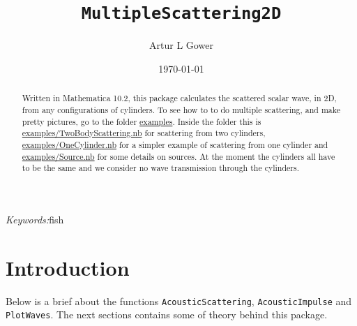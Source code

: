 \documentclass[ 12pt, a4paper]{article}
\begin{document}
\title{ \texttt{MultipleScattering2D}}
\author{
Artur L Gower\footnotemark[2]  \\[12pt]
}
\date{\today}
\maketitle


\begin{abstract}
Written in Mathematica 10.2, this package calculates the scattered scalar wave, in 2D, from any configurations of cylinders. To see how to to do multiple scattering, and make pretty pictures, go to the folder \url{examples}. Inside the folder this is \url{examples/TwoBodyScattering.nb} for scattering from two cylinders, \url{examples/OneCylinder.nb} for a simpler example of scattering from one cylinder and \url{examples/Source.nb} for some details on sources. At the moment the cylinders all have to be the same and we consider no wave transmission through the cylinders. 
\end{abstract}

\noindent
{\textit{Keywords:}fish }



\section{Introduction}

Below is a brief about the functions \texttt{AcousticScattering}, \texttt{AcousticImpulse} and \texttt{PlotWaves}. The next sections contains some of theory behind this package.
\end{document}
